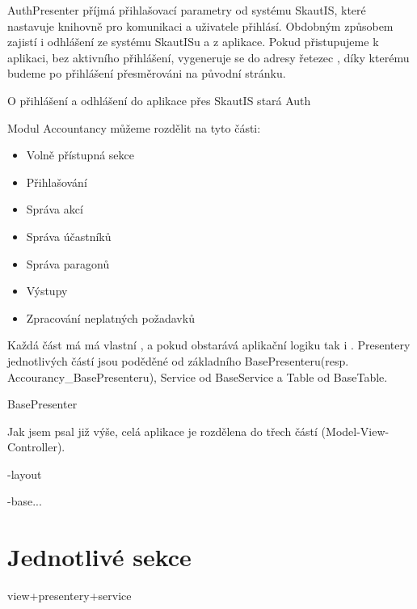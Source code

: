 \documentclass[thesis=B,czech]{FITthesis}[2011/06/14]
\begin{document}
AuthPresenter příjmá přihlašovací parametry od systému SkautIS, které nastavuje knihovně pro komunikaci a uživatele přihlásí. Obdobným způsobem zajistí i odhlášení ze systému SkautISu a z aplikace. Pokud přistupujeme k aplikaci, bez aktivního přihlášení, vygeneruje se do adresy řetezec , díky kterému budeme po přihlášení přesměrováni na původní stránku.  





O přihlášení a odhlášení do aplikace přes SkautIS stará Auth 



Modul Accountancy můžeme rozdělit na tyto části:
\begin{itemize}
	\item Volně přístupná sekce
	\item Přihlašování
	\item Správa akcí
	\item Správa účastníků
	\item Správa paragonů
	\item Výstupy
	\item Zpracování neplatných požadavků
\end{itemize}

Každá část má má vlastní ,  a pokud obstarává aplikační logiku tak i . Presentery jednotlivých částí jsou poděděné od základního BasePresenteru(resp. Accourancy\_BasePresenteru), Service od BaseService a Table od BaseTable.

BasePresenter 


Jak jsem psal již výše, celá aplikace je rozdělena do třech částí (Model-View-Controller). 

-layout

-base...

\section{Jednotlivé sekce}
view+presentery+service
\subsection{}

\subsection{}



\begin{conclusion}
\end{conclusion}
\end{document}
